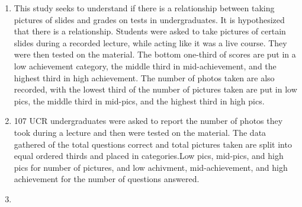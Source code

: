\documentclass[
]{article}
\newenvironment{Shaded}{\begin{snugshade}}{\end{snugshade}}
\newcommand{\AttributeTok}[1]{\textcolor[rgb]{0.77,0.63,0.00}{#1}}
\newcommand{\DecValTok}[1]{\textcolor[rgb]{0.00,0.00,0.81}{#1}}
\newcommand{\FunctionTok}[1]{\textcolor[rgb]{0.00,0.00,0.00}{#1}}
\newcommand{\NormalTok}[1]{#1}
\newcommand{\OtherTok}[1]{\textcolor[rgb]{0.56,0.35,0.01}{#1}}
\newcommand{\SpecialCharTok}[1]{\textcolor[rgb]{0.00,0.00,0.00}{#1}}
\newcommand{\StringTok}[1]{\textcolor[rgb]{0.31,0.60,0.02}{#1}}
\begin{document}
\begin{enumerate}
\def\labelenumi{\alph{enumi})}
\item
  This study seeks to understand if there is a relationship between
  taking pictures of slides and grades on tests in undergraduates. It is
  hypothesized that there is a relationship. Students were asked to take
  pictures of certain slides during a recorded lecture, while acting
  like it was a live course. They were then tested on the material. The
  bottom one-third of scores are put in a low achievement category, the
  middle third in mid-achievement, and the highest third in high
  achievement. The number of photos taken are also recorded, with the
  lowest third of the number of pictures taken are put in low pics, the
  middle third in mid-pics, and the highest third in high pics.
\item
  107 UCR undergraduates were asked to report the number of photos they
  took during a lecture and then were tested on the material. The data
  gathered of the total questions correct and total pictures taken are
  split into equal ordered thirds and placed in categories.Low pics,
  mid-pics, and high pics for number of pictures, and low achivment,
  mid-achievement, and high achievement for the number of questions
  answered.
\item
\end{enumerate}

\begin{Shaded}
\end{Shaded}
\end{document}
